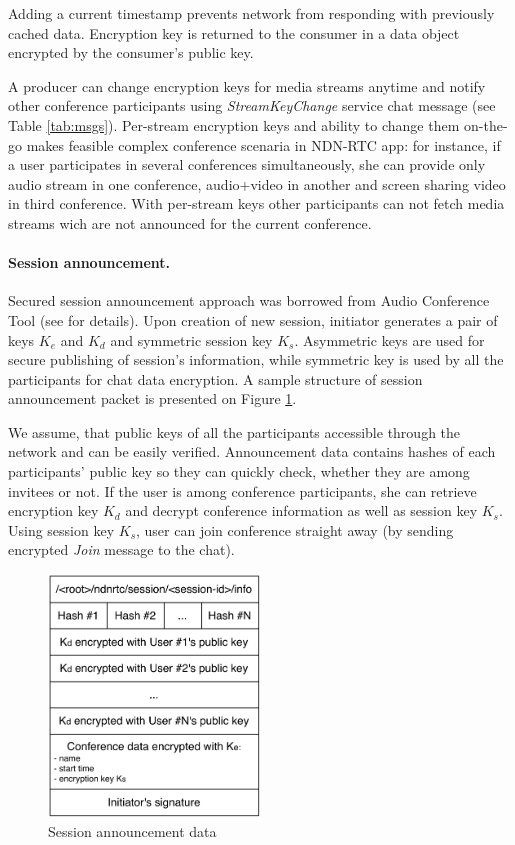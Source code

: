 \documentclass[12pt]{article}
\begin{document}
Adding a current timestamp prevents network from responding with previously cached data. Encryption key is returned to the consumer in a data object encrypted by the consumer's public key. 

A producer can change encryption keys for media streams anytime and notify other conference participants using \textit{StreamKeyChange} service chat message (see Table \ref{tab:msgs}). Per-stream encryption keys and ability to change them on-the-go makes feasible complex conference scenaria in NDN-RTC app: for instance, if a user participates in several conferences simultaneously, she can provide only audio stream in one conference, audio+video in another and screen sharing video in third conference. With per-stream keys other participants can not fetch media streams wich are not announced for the current conference.

\paragraph{Session announcement.}
Secured session announcement approach was borrowed from Audio Conference Tool (see \cite{act-sec} for details). Upon creation of new session, initiator generates a pair of keys $K_e$ and $K_d$ and symmetric session key $K_s$. Asymmetric keys are used for secure publishing of session's information, while symmetric key is used by all the participants for chat data encryption. A sample structure of session announcement packet is presented on Figure \ref{fig:conf-struct}. 

We assume, that public keys of all the participants accessible through the network and can be easily verified. Announcement data contains hashes of each participants' public key so they can quickly check, whether they are among invitees or not. If the user is among conference participants, she can retrieve encryption key $K_d$ and decrypt conference information as well as session key $K_s$. Using session key $K_s$, user can join conference straight away (by sending encrypted \textit{Join} message to the chat). 

\begin{figure}[Ht!]
\centering
\includegraphics[width=0.5\textwidth]{../res/graphics/conf-struct}
\caption{Session announcement data}
\label{fig:conf-struct}
\end{figure}
\end{document}
